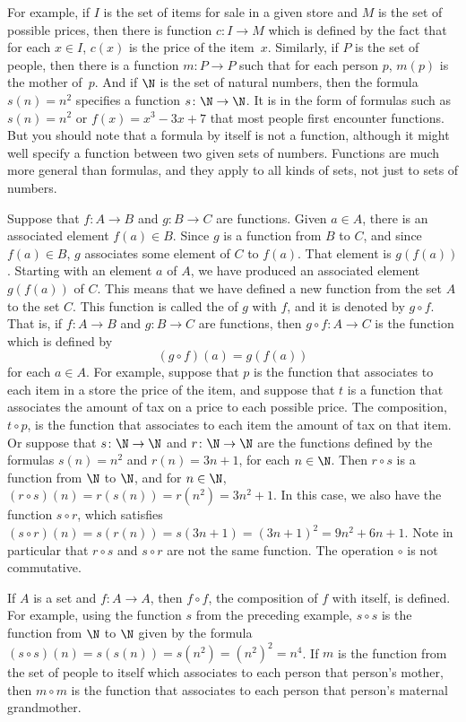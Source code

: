 For example, if $I$ is the set of items for sale in a
given store and $M$ is the set of possible prices,
then there is function $c\colon I\to M$ which
is defined by the fact that for each $x\in I$, $c(x)$
is the price of the item~$x$.  Similarly, if
$P$ is the set of people, then there is a function
$m\colon P\to P$ such that for each person $p$,
$m(p)$ is the mother of~$p$.  And if $\N$ is the set
of natural numbers, then the formula $s(n) = n^2$
specifies a function $s\colon \N\to\N$.  It is in the
form of formulas such as $s(n)=n^2$ or $f(x)=x^3-3x+7$ that
most people first encounter functions.  But you should
note that a formula by itself is not a function, although it might
well specify a function between two given sets of numbers.
Functions are much more general than formulas, and they
apply to all kinds of sets, not just to sets of numbers.

\medbreak

Suppose that $f\colon A\to B$ and $g\colon B\to C$ are functions.
Given $a\in A$, there is an associated element $f(a)\in B$.
Since $g$ is a function from $B$ to $C$, and since $f(a)\in B$,
$g$ associates some element of $C$ to $f(a)$.  That element
is $g(f(a))$.  Starting with an element $a$ of $A$, we have
produced an associated element $g(f(a))$ of $C$.  This means
that we have defined a new function from the set $A$ to
the set $C$.  This function is called the 
of $g$ with $f$, and it is denoted by $g\circ f$.  
That is, if $f\colon A\to B$ and $g\colon B\to C$ are functions,
then $g\circ f\colon A\to C$ is the function which is defined
by \[(g\circ f)(a) = g(f(a))\]
for each $a\in A$.  For example, suppose that $p$ is the function
that associates to each item in a store the price of the item,
and suppose that $t$ is a function that associates the amount of
tax on a price to each possible price.  The composition,
$t\circ p$, is the function that associates to each item the
amount of tax on that item.  Or suppose that 
$s\colon\N\to\N$ and $r\colon\N\to\N$ are the functions
defined by the formulas $s(n)=n^2$ and $r(n)=3n+1$, for each
$n\in\N$.  Then $r\circ s$ is a function from $\N$ to $\N$,
and for $n\in\N$, $(r\circ s)(n) = r(s(n)) = r(n^2) = 3n^2+1$.
In this case, we also have the function $s\circ r$, which 
satisfies $(s\circ r)(n) = s(r(n)) = s(3n+1) = (3n+1)^2 = 9n^2+6n+1$.
Note in particular that $r\circ s$ and $s\circ r$ are not
the same function.  The operation $\circ$ is not commutative.

If $A$ is a set and $f\colon A\to A$, then $f\circ f$,
the composition of $f$ with itself, is defined.  For example,
using the function $s$ from the preceding example,
$s\circ s$ is the function from $\N$ to $\N$ given by
the formula $(s\circ s)(n) = s(s(n))= s(n^2) = (n^2)^2 = n^4$.
If $m$ is the function from the set of people to itself which
associates to each person that person's mother, then
$m\circ m$ is the function that associates to each person
that person's maternal grandmother.


